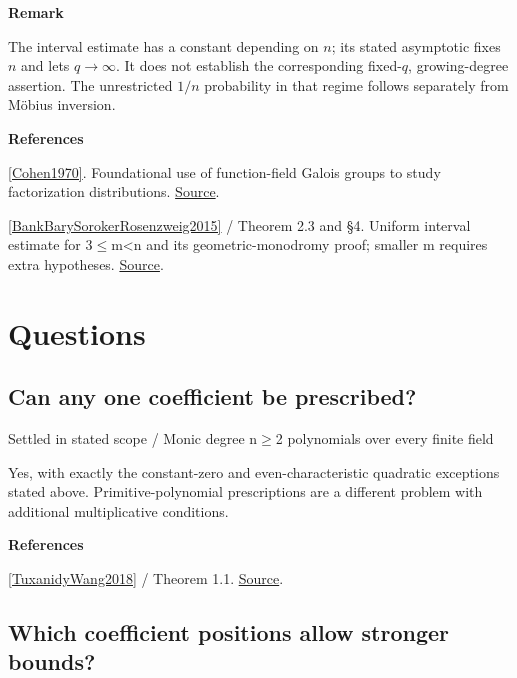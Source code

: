 \documentclass[11pt,a4paper,oneside,openany]{book}
\newenvironment{sources}{\par\smallskip\begingroup\footnotesize\color{atlasgray}\leftskip=10pt\setlength{\parskip}{2pt}}{\par\endgroup\smallskip}
\begin{document}
\begin{atlasblock}[boundary]
\textbf{\sffamily Remark}\par\smallskip
\color{black} The interval estimate has a constant depending on \(n\); its stated asymptotic fixes \(n\) and lets \(q\to\infty\). It does not establish the corresponding fixed-\(q\), growing-degree assertion. The unrestricted \(1/n\) probability in that regime follows separately from Möbius inversion.\par
\end{atlasblock}\color{black}
\begin{sources}
\textbf{References}\par\smallskip
\noindent\hyperlink{ref:Cohen1970}{[Cohen1970]}. Foundational use of function-field Galois groups to study factorization distributions. \href{https://doi.org/10.4064/aa-17-3-255-271}{Source}.\par
\noindent\hyperlink{ref:BankBarySorokerRosenzweig2015}{[BankBarySorokerRosenzweig2015]} / Theorem 2.3 and §4. Uniform interval estimate for 3\ensuremath{\le}m<n and its geometric-monodromy proof; smaller m requires extra hypotheses. \href{https://arxiv.org/abs/1302.0625}{Source}.\par
\end{sources}\color{black}
\section*{Questions}
\subsection*{Can any one coefficient be prescribed?}
{\small\sffamily\color{atlasgold}Settled in stated scope / Monic degree n\ensuremath{\ge}2 polynomials over every finite field}\par\smallskip
\color{black} Yes, with exactly the constant-zero and even-characteristic quadratic exceptions stated above. Primitive-polynomial prescriptions are a different problem with additional multiplicative conditions.\par
\begin{sources}
\textbf{References}\par\smallskip
\noindent\hyperlink{ref:TuxanidyWang2018}{[TuxanidyWang2018]} / Theorem 1.1.  \href{https://arxiv.org/abs/1604.04023}{Source}.\par
\end{sources}\color{black}
\subsection*{Which coefficient positions allow stronger bounds?}
\end{document}
